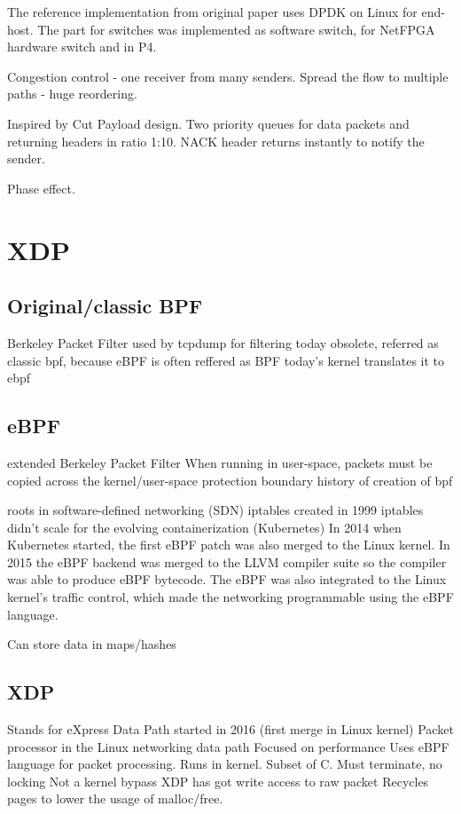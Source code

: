 The reference implementation from original paper uses DPDK on Linux for end-host.
The part for switches was implemented as software switch, for NetFPGA hardware switch and in P4.

Congestion control - one receiver from many senders.
Spread the flow to multiple paths - huge reordering.

Inspired by Cut Payload design.
Two priority queues for data packets and returning headers in ratio 1:10.
NACK header returns instantly to notify the sender.

Phase effect.



\chapter{XDP}

\section{Original/classic BPF}
Berkeley Packet Filter
used by tcpdump for filtering
today obsolete, referred as classic bpf, because eBPF is often reffered as BPF
today's kernel translates it to ebpf


\section{eBPF}
extended Berkeley Packet Filter
When running in user-space, packets must be copied across the kernel/user-space protection boundary
history of creation of bpf

roots in software-defined networking (SDN)
iptables created in 1999
iptables didn't scale for the evolving containerization (Kubernetes)
In 2014 when Kubernetes started, the first eBPF patch was also merged to the Linux kernel.
In 2015 the eBPF backend was merged to the LLVM compiler suite so the compiler was able to produce eBPF bytecode.
The eBPF was also integrated to the Linux kernel's traffic control, which made the networking programmable using the eBPF language.

Can store data in maps/hashes


\section{XDP}
Stands for eXpress Data Path 
started in 2016 (first merge in Linux kernel)
Packet processor in the Linux networking data path
Focused on performance
Uses eBPF language for packet processing.
Runs in kernel.
Subset of C.
Must terminate, no locking
Not a kernel bypass
XDP has got write access to raw packet
Recycles pages to lower the usage of malloc/free.

